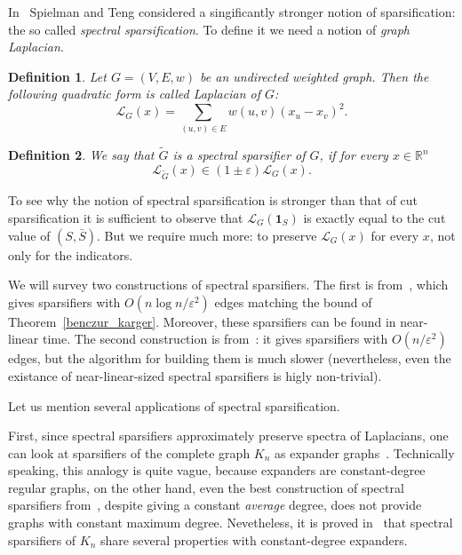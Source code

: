 \documentclass[12pt]{article}
\newcommand{\Rbb}{\mathbb{R}}
\newcommand{\eps}{\varepsilon}
\newtheorem{definition}{Definition}
\begin{document}
    In~\cite{ST11} Spielman and Teng considered a singificantly stronger notion of sparsification: the so called
    \emph{spectral sparsification}. To define it we need a notion of \emph{graph Laplacian}.

    \begin{definition}
        Let $G = (V, E, w)$ be an undirected weighted graph. Then the following quadratic form is called \emph{Laplacian}
        of $G$:
        $$
            \mathcal{L}_G(x) = \sum_{(u, v) \in E} w(u, v) (x_u - x_v)^2.
        $$
    \end{definition}
    \begin{definition}
        We say that $\tilde{G}$ is a spectral sparsifier of $G$, if for every $x \in \Rbb^n$
        $$
            \mathcal{L}_{\tilde{G}}(x) \in (1 \pm \eps) \mathcal{L}_G(x).
        $$
    \end{definition}

    To see why the notion of spectral sparsification is stronger than that of cut sparsification it is sufficient to observe
    that $\mathcal{L}_G(\mathbf{1}_S)$ is exactly equal to the cut value of $(S, \bar{S})$.
    But we require much more: to preserve $\mathcal{L}_G(x)$ for every $x$, not only for the indicators.

    We will survey two constructions of spectral sparsifiers. The first is from~\cite{SS11}, which gives sparsifiers
    with $O(n \log n / \eps^2)$ edges
    matching the bound of Theorem~\ref{benczur_karger}. Moreover, these sparsifiers can be found
    in near-linear time. The second construction is from~\cite{BSS09}: it gives sparsifiers with $O(n / \eps^2)$ edges,
    but the algorithm for building them is much slower (nevertheless, even the existance of near-linear-sized spectral
    sparsifiers is higly non-trivial).

    Let us mention several applications of spectral sparsification.

    First, since spectral sparsifiers approximately preserve spectra of Laplacians, one can look at sparsifiers of the
    complete graph $K_n$ as expander graphs~\cite{HLW06}. Technically speaking, this analogy is quite vague, because
    expanders are constant-degree regular graphs, on the other hand, even the best construction of spectral sparsifiers
    from~\cite{BSS09}, despite giving a constant \emph{average} degree, does not provide graphs with constant maximum
    degree. Nevetheless, it is proved in~\cite{BSS09} that spectral sparsifiers of $K_n$ share several properties with
    constant-degree expanders.
\end{document}

